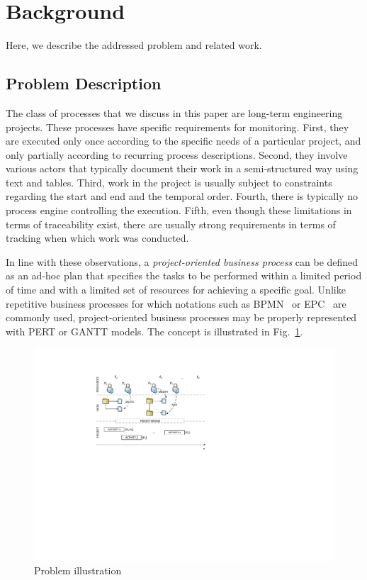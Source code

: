 \section{Background}
\label{sec:bpm2015:background}

Here, we describe the addressed problem and related work.


\subsection{Problem Description}\label{sec:bpm2015:problem}
The class of processes that we discuss in this paper are long-term engineering projects. These processes have specific requirements for monitoring. First, they are executed only once according to the specific needs of a particular project, and only partially according to recurring process descriptions. Second, they involve various actors that typically document their work in a semi-structured way using text and tables. Third, work in the project is usually subject to constraints regarding the start and end and the temporal order. Fourth, there is typically no process engine controlling the execution. Fifth, even though these limitations in terms of traceability exist, there are usually strong requirements in terms of tracking when which work was conducted.


In line with these observations, a \textit{project-oriented business process} can be defined as an ad-hoc plan that specifies the tasks to be performed within a limited period of time and with a limited set of resources for achieving a specific goal. Unlike repetitive business processes for which notations such as BPMN~\citep{bpmn2_stable} or EPC~\citep{vanderaalst_formalization_1999} are commonly used, project-oriented business processes may be properly represented with PERT or GANTT models. The concept is illustrated in Fig.~\ref{fig:problem}.


\begin{figure}[tb]
\centering
\includegraphics[width=.8\textwidth]{bpm2015/imgs/ProjectMining.pdf}
\caption{Problem illustration}
\label{fig:problem}
\end{figure}

